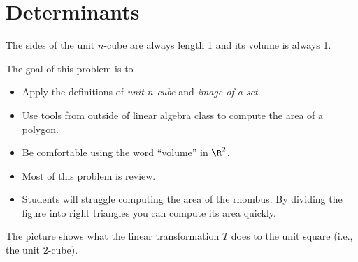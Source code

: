\section*{Determinants}
	The sides of the unit $n$-cube are always length 1 and its volume is always 1.

	\question
	\begin{annotation}
		\begin{goals}

			The goal of this problem is to
			\begin{itemize}
				\item Apply the definitions of \emph{unit $n$-cube} and \emph{image of a set}.
				\item Use tools from outside of linear algebra class to compute the area of a polygon.
				\item Be comfortable using the word ``volume'' in $\R^2$.
			\end{itemize}
		\end{goals}

		\begin{notes}
			\begin{itemize}
				\item Most of this problem is review.
				\item Students will struggle computing the area of the rhombus. By dividing
					the figure into right triangles you can compute its area quickly.
			\end{itemize}
		\end{notes}
	\end{annotation}
	The picture shows what the linear transformation $T$ does to the unit square (i.e., the unit $2$-cube).

